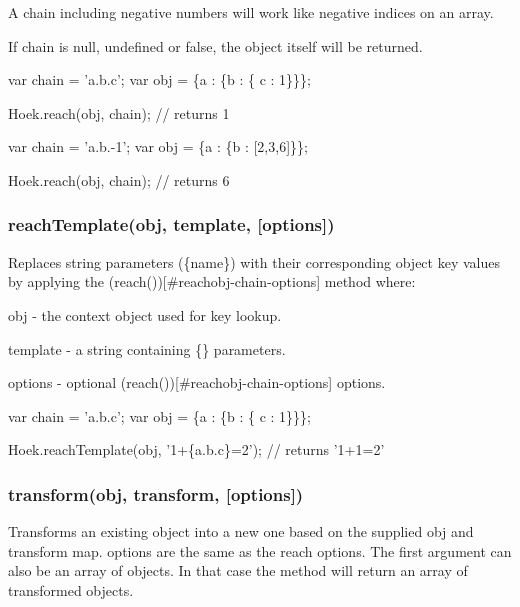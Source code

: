 A chain including negative numbers will work like negative indices on an array.

If chain is {\ttfamily null}, {\ttfamily undefined} or {\ttfamily false}, the object itself will be returned.


\begin{DoxyCode}
var chain = 'a.b.c';
var obj = \{a : \{b : \{ c : 1\}\}\};

Hoek.reach(obj, chain); // returns 1

var chain = 'a.b.-1';
var obj = \{a : \{b : [2,3,6]\}\};

Hoek.reach(obj, chain); // returns 6
\end{DoxyCode}


\subsubsection*{reach\+Template(obj, template, \mbox{[}options\mbox{]})}

Replaces string parameters ({\ttfamily \{name\}}) with their corresponding object key values by applying the ({\ttfamily reach()})\mbox{[}\#reachobj-\/chain-\/options\mbox{]} method where\+:


\begin{DoxyItemize}
\item {\ttfamily obj} -\/ the context object used for key lookup.
\item {\ttfamily template} -\/ a string containing {\ttfamily \{\}} parameters.
\item {\ttfamily options} -\/ optional ({\ttfamily reach()})\mbox{[}\#reachobj-\/chain-\/options\mbox{]} options.
\end{DoxyItemize}


\begin{DoxyCode}
var chain = 'a.b.c';
var obj = \{a : \{b : \{ c : 1\}\}\};

Hoek.reachTemplate(obj, '1+\{a.b.c\}=2'); // returns '1+1=2'
\end{DoxyCode}


\subsubsection*{transform(obj, transform, \mbox{[}options\mbox{]})}

Transforms an existing object into a new one based on the supplied {\ttfamily obj} and {\ttfamily transform} map. {\ttfamily options} are the same as the {\ttfamily reach} options. The first argument can also be an array of objects. In that case the method will return an array of transformed objects.


